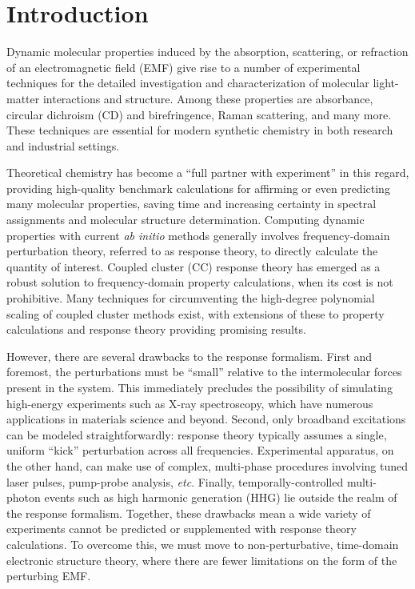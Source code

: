 
\section{Introduction} \label{se:intro} Dynamic molecular properties induced
by the absorption, scattering, or refraction of an electromagnetic field
(EMF) give rise to a number of experimental techniques for the detailed
investigation and characterization of molecular light-matter interactions
and structure.\cite{Barron2004} Among these properties are absorbance,
circular dichroism (CD) and birefringence, Raman scattering, and many more.
These techniques are essential for modern synthetic chemistry in both
research and industrial settings.

Theoretical chemistry has become a ``full partner with experiment''
\cite{Goddard1985} in this regard, providing high-quality benchmark
calculations for affirming or even predicting many molecular properties,
saving time and increasing certainty in spectral assignments and
molecular structure determination. Computing dynamic properties with
current \textit{ab initio} methods generally involves frequency-domain
perturbation theory, referred to as response theory, to directly calculate
the quantity of interest. \cite{Crawford2006,Norman2011,Helgaker2012}
Coupled cluster (CC) response theory\cite{Koch1990,Pedersen1997} has
emerged as a robust solution to frequency-domain property calculations,
when its cost is not prohibitive.\cite{Crawford2018,Crawford2019} Many
techniques for circumventing the high-degree polynomial scaling of
coupled cluster methods exist, with extensions of these to property
calculations and response theory providing promising results.
\cite{McAlexander2016,Kumar2017,Howard2018,DCunha2021}

However, there are several drawbacks to the response
formalism.\cite{Langhoff,Goings2018,Li2020} First and foremost, the
perturbations must be ``small'' relative to the intermolecular forces
present in the system. This immediately precludes the possibility of
simulating high-energy experiments such as X-ray spectroscopy, which
have numerous applications in materials science and beyond. Second,
only broadband excitations can be modeled straightforwardly: response
theory typically assumes a single, uniform ``kick'' perturbation
across all frequencies. Experimental apparatus, on the other hand,
can make use of complex, multi-phase procedures involving tuned laser
pulses, pump-probe analysis, \textit{etc}.\cite{Maiuri2020} Finally,
temporally-controlled multi-photon events such as high harmonic generation
(HHG)\cite{Lewenstein1994,Gorlach} lie outside the realm of the response
formalism. Together, these drawbacks mean a wide variety of experiments
cannot be predicted or supplemented with response theory calculations. To
overcome this, we must move to non-perturbative, time-domain electronic
structure theory, \cite{Goings2018,Crawford2019,Li2020} where there are
fewer limitations on the form of the perturbing EMF.

